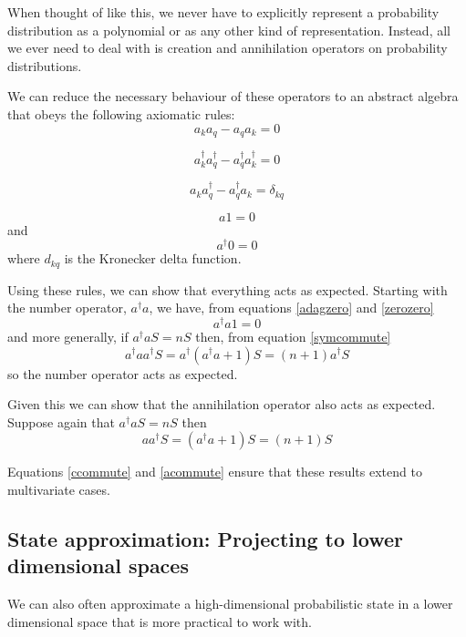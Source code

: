 \documentclass[letterpaper,twocolumn,10pt]{article}
\begin{document}
When thought of like this, we never have to explicitly represent a probability distribution as a polynomial or as any other kind of representation. Instead, all we ever need to deal with is creation and annihilation operators on probability distributions.

We can reduce the necessary behaviour of these operators to an abstract algebra that obeys the following axiomatic rules:
\begin{equation}
a_k a_q - a_q a_k = 0
\label{ccommute}
\end{equation}

\begin{equation}
a_k^\dag a_q^\dag - a_q^\dag a_k^\dag = 0
\label{acommute}
\end{equation}

\begin{equation}
a_k a_q^\dag - a_q^\dag a_k = \delta_{kq}
\label{symcommute}
\end{equation}

\begin{equation}
a1 = 0
\label{adagzero} 
\end{equation}
and
\begin{equation}
a^\dag 0 = 0
\label{zerozero}
\end{equation}
where $d_{kq}$ is the Kronecker delta function.

Using these rules, we can show that everything acts as expected. Starting with the number operator, $a^\dag a$, we have, from equations \ref{adagzero} and \ref{zerozero}
\[
a^\dag a 1 = 0
\]
and more generally, if $a^\dag a S = nS$ then, from equation \ref{symcommute}
\[
a^\dag a a^\dag S = a^\dag(a^\dag a +1)S = (n+1)a^\dag S
\]
so the number operator acts as expected.

Given this we can show that the annihilation operator also acts as expected. Suppose again that $a^\dag a S = nS$ then
\[
a a^\dag S = (a^\dag a+1)S = (n+1)S
\]

Equations \ref{ccommute} and \ref{acommute} ensure that these results extend to multivariate cases.

\subsection{State approximation: Projecting to lower dimensional spaces}

We can also often approximate a high-dimensional probabilistic state in a lower dimensional space that is more practical to work with.
\end{document}
